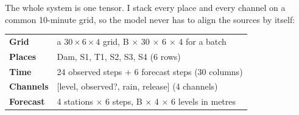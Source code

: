 \documentclass[11pt,letterpaper]{article}
\begin{document}
The whole system is one tensor. I stack every place and every channel on a common
10-minute grid, so the model never has to align the sources by itself:

\begin{center}
\begin{tabular}{@{}p{0.95in}p{5.5in}@{}}
\textbf{Grid}      & a $30\times6\times4$ grid, B $\times$ 30 $\times$ 6 $\times$ 4 for a batch \\
\textbf{Places}   & Dam, S1, T1, S2, S3, S4 (6 rows) \\
\textbf{Time}     & 24 observed steps $+$ 6 forecast steps (30 columns) \\
\textbf{Channels} & $[$level, observed?, rain, release$]$ (4 channels) \\
\textbf{Forecast} & 4 stations $\times$ 6 steps, B $\times$ 4 $\times$ 6 levels in metres \\
\end{tabular}
\end{center}
\end{document}
